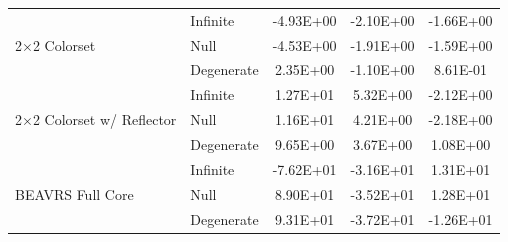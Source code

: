 \begin{table}[h!]
\begin{tabular}{l l c c c}
  \midrule
\multirow{3}{*}{\parbox{2.5cm}{2$\times$2 Colorset}} & Infinite & -4.93E+00 & -2.10E+00 & -1.66E+00 \\
& Null & -4.53E+00 & -1.91E+00 & -1.59E+00 \\
& Degenerate & 2.35E+00 & -1.10E+00 & 8.61E-01 \\
  \midrule
\multirow{3}{*}{\parbox{2.5cm}{2$\times$2 Colorset w/ Reflector}} & Infinite & 1.27E+01 & 5.32E+00 & -2.12E+00 \\
& Null & 1.16E+01 & 4.21E+00 & -2.18E+00 \\
& Degenerate & 9.65E+00 & 3.67E+00 & 1.08E+00 \\
  \midrule
\multirow{3}{*}{\parbox{2.5cm}{BEAVRS Full Core}} & Infinite & -7.62E+01 & -3.16E+01 & 1.31E+01 \\
& Null & 8.90E+01 & -3.52E+01 & 1.28E+01 \\
& Degenerate & 9.31E+01 & -3.72E+01 & -1.26E+01 \\
  \bottomrule
\end{tabular}
\end{table}

